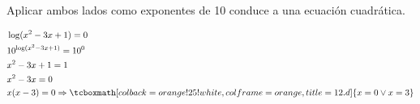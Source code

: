 \documentclass{article}
\newcommand{\hresult}[2]{\tcboxmath[colback=orange!25!white,colframe=orange, title=#1] {#2} }
\begin{document}
Aplicar ambos lados como exponentes de 10 conduce a una ecuación cuadrática.

\begin{subequations}
\begin{align}
& \log(x^2 - 3x + 1) = 0 \\
& 10^{\log(x^2 - 3x + 1)} = 10^0 \\
& x^2 - 3x + 1 = 1 \\
& x^2 - 3x = 0 \\
& x (x-3) = 0 \Rightarrow \hresult{12.d}{ x = 0 \vee x = 3 }
\end{align}
\end{subequations}
\end{document}
